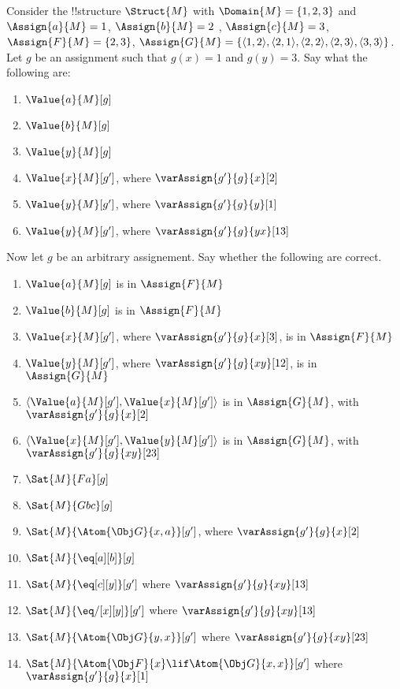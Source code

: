 \documentclass[../../../../include/open-logic-section]{subfiles}
\begin{document}
\begin{prob}
Consider the !!{structure} $\Struct{M}$
with $\Domain{M}=\{1,2,3\}$ and $\Assign{a}{M}=1$, $\Assign{b}{M}=2$
, $\Assign{c}{M}=3$, $\Assign{F}{M}=\{2,3\}$, $\Assign{G}{M}=\{\langle1,2\rangle,\langle2,1\rangle,\langle2,2\rangle,\langle2,3\rangle,\langle3,3\rangle\}$. \\
Let $g$ be an assignment such that $g(x)=1$ and $g(y)=3$. Say what
the following are:
\begin{enumerate}
	\item $\Value{a}{M}[g]$
	\item $\Value{b}{M}[g]$
	\item $\Value{y}{M}[g]$
	\item $\Value{x}{M}[g']$, where $\varAssign{g'}{g}{x}[2]$
	\item $\Value{y}{M}[g']$, where $\varAssign{g'}{g}{y}[1]$
	\item $\Value{y}{M}[g']$, where $\varAssign{g'}{g}{yx}[13]$
\end{enumerate}
Now let $g$ be an arbitrary assignement. Say whether the following
are correct.
\begin{enumerate}
	\item $\Value{a}{M}[g]$ is in $\Assign{F}{M}$
	\item $\Value{b}{M}[g]$ is in $\Assign{F}{M}$
	\item $\Value{x}{M}[g']$, where $\varAssign{g'}{g}{x}[3]$, is in $\Assign{F}{M}$
	\item $\Value{y}{M}[g']$, where $\varAssign{g'}{g}{xy}[12]$, is in $\Assign{G}{M}$
	\item $\langle\Value{a}{M}[g'], \Value{x}{M}[g']\rangle$ is in $\Assign{G}{M}$, with $\varAssign{g'}{g}{x}[2]$
	\item $\langle\Value{x}{M}[g'], \Value{y}{M}[g']\rangle$ is in $\Assign{G}{M}$, with $\varAssign{g'}{g}{xy}[23]$
	\item $\Sat{M}{Fa}[g]$
	\item $\Sat{M}{Gbc}[g]$
	\item $\Sat{M}{\Atom{\Obj G}{x,a}}[g']$, where $\varAssign{g'}{g}{x}[2]$
	\item $\Sat{M}{\eq[a][b]}[g]$
	\item $\Sat{M}{\eq[c][y]}[g']$ where $\varAssign{g'}{g}{xy}[13]$
	\item $\Sat{M}{\eq/[x][y]}[g']$ where $\varAssign{g'}{g}{xy}[13]$
	\item $\Sat{M}{\Atom{\Obj G}{y,x}}[g']$ where $\varAssign{g'}{g}{xy}[23]$
	\item $\Sat{M}{\Atom{\Obj F}{x}\lif \Atom{\Obj G}{x,x}}[g']$ where $\varAssign{g'}{g}{x}[1]$

\end{enumerate}
\end{prob}
\end{document}
